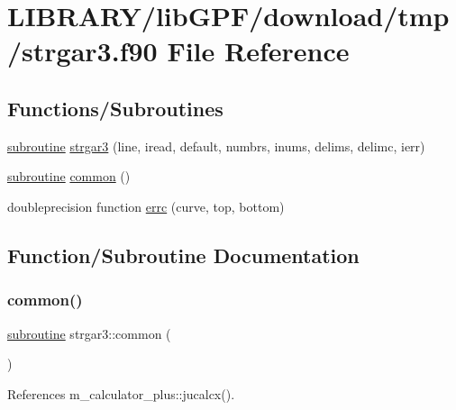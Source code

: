 \hypertarget{strgar3_8f90}{}\section{L\+I\+B\+R\+A\+R\+Y/lib\+G\+P\+F/download/tmp/strgar3.f90 File Reference}
\label{strgar3_8f90}
\subsection*{Functions/\+Subroutines}
\begin{DoxyCompactItemize}
\item 
\hyperlink{M__stopwatch_83_8txt_acfbcff50169d691ff02d4a123ed70482}{subroutine} \hyperlink{strgar3_8f90_a0934cb639dc2db3450626e1515726e8c}{strgar3} (line, iread, default, numbrs, inums, delims, delimc, ierr)
\item 
\hyperlink{M__stopwatch_83_8txt_acfbcff50169d691ff02d4a123ed70482}{subroutine} \hyperlink{strgar3_8f90_a96cfa8fe4e730b87185eb5629575c039}{common} ()
\item 
doubleprecision function \hyperlink{strgar3_8f90_adec4c296d118e928067278d0eda4d60c}{errc} (curve, top, bottom)
\end{DoxyCompactItemize}


\subsection{Function/\+Subroutine Documentation}
\mbox{\label{strgar3_8f90_a96cfa8fe4e730b87185eb5629575c039}} 
\subsubsection{\texorpdfstring{common()}{common()}}
{\footnotesize\ttfamily \hyperlink{M__stopwatch_83_8txt_acfbcff50169d691ff02d4a123ed70482}{subroutine} strgar3\+::common (\begin{DoxyParamCaption}{ }\end{DoxyParamCaption})}



References m\+\_\+calculator\+\_\+plus\+::jucalcx().

